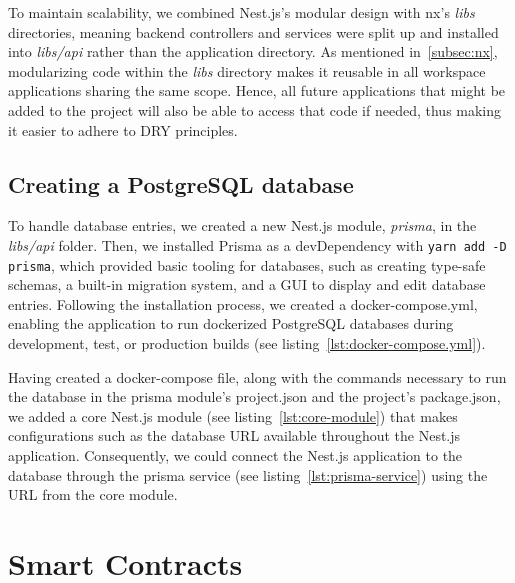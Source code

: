To maintain scalability, we combined Nest.js's modular design with nx's \emph{libs} directories, meaning backend controllers and services were split up and installed into \emph{libs/api} rather than the application directory.
As mentioned in~\cref{subsec:nx}, modularizing code within the \emph{libs} directory makes it reusable in all workspace applications sharing the same scope.
Hence, all future applications that might be added to the project will also be able to access that code if needed, thus making it easier to adhere to \gls{DRY} principles.

\subsection{Creating a PostgreSQL database}\label{subsec:creating-a-postgresql-database}

To handle database entries, we created a new Nest.js module, \emph{prisma}, in the \emph{libs/api} folder.
Then, we installed Prisma as a devDependency with \texttt{yarn add -D prisma}, which provided basic tooling for databases, such as creating type-safe schemas, a built-in migration system, and a \gls{GUI} to display and edit database entries.
Following the installation process, we created a docker-compose.yml, enabling the application to run dockerized PostgreSQL databases during development, test, or production builds (see listing~\ref{lst:docker-compose.yml}).


Having created a docker-compose file, along with the commands necessary to run the database in the prisma module’s project.json and the project’s package.json, we added a core Nest.js module (see listing~\ref{lst:core-module}) that makes configurations such as the database \gls{URL} available throughout the Nest.js application.
Consequently, we could connect the Nest.js application to the database through the prisma service (see listing~\ref{lst:prisma-service}) using the \gls{URL} from the core module.


\section{Smart Contracts}\label{sec:smart-contracts}
















